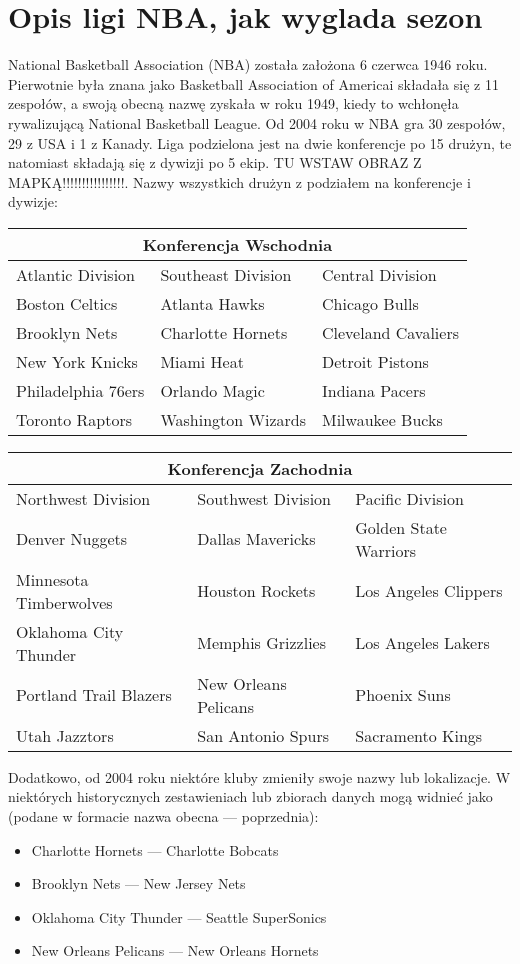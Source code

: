 \documentclass[inzynierska]{pwr_wmat_praca_dyplomowa}
\theoremstyle{plain}
\numberwithin{theorem}{chapter}
\theoremstyle{definition}
\numberwithin{theorem}{chapter}
\begin{document}
\chapter{Opis ligi NBA, jak wyglada sezon}
National Basketball Association (NBA) została założona 6 czerwca 1946 roku. Pierwotnie była znana jako Basketball Association of Americai składała się z 11 zespołów, a swoją obecną nazwę zyskała w roku 1949, kiedy to wchłonęła rywalizującą National Basketball League. Od 2004 roku w NBA gra 30 zespołów, 29 z USA i 1 z Kanady. Liga podzielona jest na dwie konferencje po 15 drużyn, te natomiast składają się z dywizji po 5 ekip. TU WSTAW OBRAZ Z MAPKĄ!!!!!!!!!!!!!!!!. Nazwy wszystkich drużyn z podziałem na konferencje i dywizje:
\begin{table}[]
\begin{tabular}{ |p{5cm}|p{5cm}|p{5cm}|  }
	\hline
	\multicolumn{3}{|c|}{Konferencja Wschodnia} \\
	\hline
	Atlantic Division& Southeast Division&Central Division\\
	\hline
	Boston Celtics& Atlanta Hawks &Chicago Bulls\\\hline
	Brooklyn Nets&Charlotte Hornets&Cleveland Cavaliers\\\hline
	New York Knicks &Miami Heat &Detroit Pistons\\\hline
	Philadelphia 76ers&Orlando Magic &Indiana Pacers\\\hline
	Toronto Raptors&Washington Wizards&Milwaukee Bucks\\\hline
	\hline
\end{tabular}
\end{table}
\begin{table}[]
\begin{tabular}{ |p{5cm}|p{5cm}|p{5cm}|  }
	\hline
	\multicolumn{3}{|c|}{Konferencja Zachodnia} \\
	\hline
	Northwest Division& Southwest Division&Pacific Division\\
	\hline
	Denver Nuggets& Dallas Mavericks &Golden State Warriors\\\hline
	Minnesota Timberwolves&Houston Rockets &Los Angeles Clippers\\\hline
	Oklahoma City Thunder&Memphis Grizzlies &Los Angeles Lakers\\\hline
	Portland Trail Blazers&New Orleans Pelicans &Phoenix Suns\\\hline
	Utah Jazztors&San Antonio Spurs&Sacramento Kings\\
	\hline
\end{tabular}
\end{table}
Dodatkowo, od 2004 roku niektóre kluby zmieniły swoje nazwy lub lokalizacje. W niektórych historycznych zestawieniach lub zbiorach danych mogą widnieć jako (podane w formacie nazwa obecna --- poprzednia):
\begin{itemize}
	\item Charlotte Hornets --- Charlotte Bobcats
	\item Brooklyn Nets --- New Jersey Nets
	\item Oklahoma City Thunder --- Seattle SuperSonics
	\item New Orleans Pelicans --- New Orleans Hornets
\end{itemize}
\end{document}
